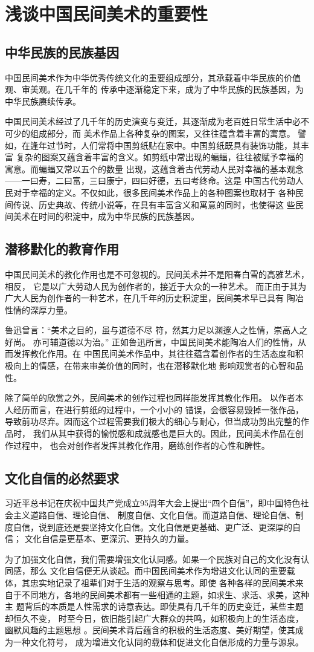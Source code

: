\section{浅谈中国民间美术的重要性}
\subsection{中华民族的民族基因}
中国民间美术作为中华优秀传统文化的重要组成部分，其承载着中华民族的价值观、审美观。在几千年的
传承中逐渐稳定下来，成为了中华民族的民族基因，为中华民族赓续传承。

中国民间美术经过了几千年的历史演变与变迁，其逐渐成为老百姓日常生活中必不可少的组成部分，而
美术作品上各种复杂的图案，又往往蕴含着丰富的寓意。
譬如，在逢年过节时，人们常将中国剪纸贴在家中。中国剪纸既具有装饰功能，其丰富
复杂的图案又蕴含着丰富的含义。如剪纸中常出现的蝙蝠，往往被赋予幸福的寓意。而蝙蝠又常以五个的数量
出现，这蕴含着古代劳动人民对幸福的基本观念——一曰寿，二曰富，三曰康宁，四曰好德，五曰考终命。这是
中国古代劳动人民对于幸福的定义。不仅如此，很多民间美术作品上的各种图案也取材于
各种民间传说、历史典故、传统小说等，在具有丰富含义和寓意的同时，也使得这
些民间美术在时间的积淀中，成为中华民族的民族基因。



\subsection{潜移默化的教育作用}
中国民间美术的教化作用也是不可忽视的。民间美术并不是阳春白雪的高雅艺术，相反，
它是以广大劳动人民为创作者的，接近于大众的一种艺术。
而正由于其为广大人民为创作者的一种艺术，在几千年的历史积淀里，民间美术早已具有
陶冶性情的深厚力量。


鲁迅曾言：“美术之目的，虽与道德不尽
符，然其力足以渊邃人之性情，崇高人之好尚。
亦可辅道德以为治。”
正如鲁迅所言，中国民间美术能陶冶人们的性情，从而发挥教化作用。在
中国民间美术作品中，其往往蕴含着创作者的生活态度和积极向上的情感，在带来审美价值的同时，也在潜移默化地
影响观赏者的心智和品性。

除了简单的欣赏之外，民间美术的创作过程也同样能发挥其教化作用。
以作者本人经历而言，在进行剪纸的过程中，一个小小的
错误，会很容易毁掉一张作品，导致前功尽弃。因而这个过程需要我们极大的细心与耐心，但当成功剪出完整的作品时，
我们从其中获得的愉悦感和成就感也是巨大的。因此，民间美术作品在创作过程中，
也会对创作者发挥其教化作用，磨练创作者的心性和脾性。



\subsection{文化自信的必然要求}
习近平总书记在庆祝中国共产党成立95周年大会上提出“四个自信”，即中国特色社会主义道路自信、理论自信、
制度自信、文化自信。而道路自信、理论自信、制度自信，说到底还是要坚持文化自信。文化自信是更基础、更广泛、更深厚的自信；
文化自信是更基本、更深沉、更持久的力量。

为了加强文化自信，我们需要增强文化认同感。如果一个民族对自己的文化没有认同感，那么
文化自信便无从谈起。而中国民间美术作为增进文化认同的重要载体，其忠实地记录了祖辈们对于生活的观察与思考。即使
各种各样的民间美术来自于不同地方，各地的民间美术都有一些相通的主题，如求生、求活、求美，这种主
题背后的本质是人性需求的诗意表达。即使具有几千年的历史变迁，某些主题却恒久不变，
时至今日，依旧能引起广大群众的共鸣，如积极向上的生活态度，幽默风趣的主题思想
。民间美术背后蕴含的积极的生活态度、美好期望，使其成为一种文化符号，
成为增进文化认同的载体和促进文化自信形成的力量与源泉。

